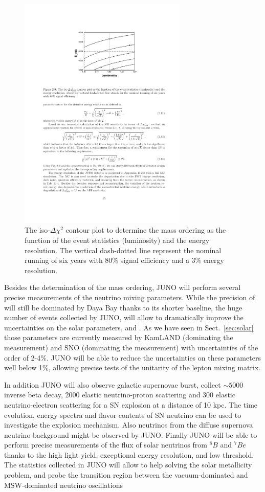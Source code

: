 \begin{figure} [h!]
\begin{center}
\includegraphics[width=8cm]{figures/juno_energyres.pdf}
\caption{\label{fig:junoeneres} The iso-$\Delta\chi^2$ contour plot to determine the mass ordering as the function of the event statistics (luminosity) and the energy resolution. The vertical dash-dotted line represent the nominal running of six years with 80\% signal efficiency and a 3\% energy resolution.}
\end{center}
\end{figure}


Besides the determination of the mass ordering, JUNO will perform several precise measurements of the neutrino mixing parameters. While the precision of \thint will still be dominated by Daya Bay thanks to its shorter baseline, the huge number of events collected by JUNO, will allow to dramatically improve the uncertainties on the solar parameters, \thsol and \dmsqso. As we have seen in Sect.~\ref{sec:solar} those parameters are currently measured by KamLAND (dominating the \dmsqso measurement) and SNO (dominating the \thsol measurement) with uncertainties of the order of 2-4\%. JUNO will be able to reduce the uncertainties on these parameters well below 1\%, allowing precise tests of the unitarity of the lepton mixing matrix.

In addition JUNO will also observe galactic supernovae burst, collect $\sim5000$ inverse beta decay, 2000 elastic neutrino-proton scattering and 300 elastic neutrino-electron scattering for a SN explosion at a distance of 10 kpc. The time evolution, energy spectra and flavor contents of SN neutrino can be used to investigate the explosion mechanism. Also neutrinos from the diffuse supernova neutrino background might be observed by JUNO. Finally JUNO will be able to perform precise measurements of the flux of solar neutrinos from $^8B$ and $^7Be$ thanks to the high light yield, exceptional energy resolution, and  low threshold. The statistics collected in JUNO will allow to help solving the solar metallicity problem, and probe the transition region between the vacuum-dominated and MSW-dominated neutrino oscillations 


